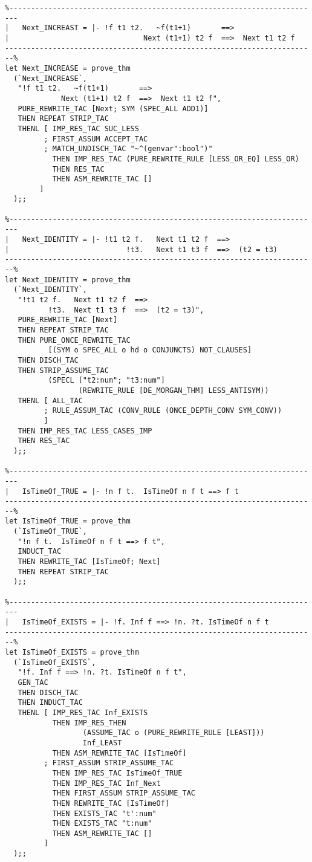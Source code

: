\begin{verbatim}
%------------------------------------------------------------------------
|   Next_INCREAST = |- !f t1 t2.   ~f(t1+1)       ==>
|                               Next (t1+1) t2 f  ==>  Next t1 t2 f
------------------------------------------------------------------------%
let Next_INCREASE = prove_thm
  (`Next_INCREASE`,
   "!f t1 t2.   ~f(t1+1)       ==>
             Next (t1+1) t2 f  ==>  Next t1 t2 f",
   PURE_REWRITE_TAC [Next; SYM (SPEC_ALL ADD1)]
   THEN REPEAT STRIP_TAC
   THENL [ IMP_RES_TAC SUC_LESS
         ; FIRST_ASSUM ACCEPT_TAC
         ; MATCH_UNDISCH_TAC "~^(genvar":bool")"
           THEN IMP_RES_TAC (PURE_REWRITE_RULE [LESS_OR_EQ] LESS_OR)
           THEN RES_TAC
           THEN ASM_REWRITE_TAC []
        ]
  );;

%------------------------------------------------------------------------
|   Next_IDENTITY = |- !t1 t2 f.   Next t1 t2 f  ==>
|                           !t3.   Next t1 t3 f  ==>  (t2 = t3)
------------------------------------------------------------------------%
let Next_IDENTITY = prove_thm
  (`Next_IDENTITY`,
   "!t1 t2 f.   Next t1 t2 f  ==>
          !t3.  Next t1 t3 f  ==>  (t2 = t3)",
   PURE_REWRITE_TAC [Next]
   THEN REPEAT STRIP_TAC
   THEN PURE_ONCE_REWRITE_TAC
          [(SYM o SPEC_ALL o hd o CONJUNCTS) NOT_CLAUSES]
   THEN DISCH_TAC
   THEN STRIP_ASSUME_TAC
          (SPECL ["t2:num"; "t3:num"]
                 (REWRITE_RULE [DE_MORGAN_THM] LESS_ANTISYM))
   THENL [ ALL_TAC
         ; RULE_ASSUM_TAC (CONV_RULE (ONCE_DEPTH_CONV SYM_CONV))
         ]
   THEN IMP_RES_TAC LESS_CASES_IMP
   THEN RES_TAC
  );;

%------------------------------------------------------------------------
|   IsTimeOf_TRUE = |- !n f t.  IsTimeOf n f t ==> f t
------------------------------------------------------------------------%
let IsTimeOf_TRUE = prove_thm
  (`IsTimeOf_TRUE`,
   "!n f t.  IsTimeOf n f t ==> f t",
   INDUCT_TAC
   THEN REWRITE_TAC [IsTimeOf; Next]
   THEN REPEAT STRIP_TAC
  );;

%------------------------------------------------------------------------
|   IsTimeOf_EXISTS = |- !f. Inf f ==> !n. ?t. IsTimeOf n f t
------------------------------------------------------------------------%
let IsTimeOf_EXISTS = prove_thm
  (`IsTimeOf_EXISTS`,
   "!f. Inf f ==> !n. ?t. IsTimeOf n f t",
   GEN_TAC
   THEN DISCH_TAC
   THEN INDUCT_TAC
   THENL [ IMP_RES_TAC Inf_EXISTS
           THEN IMP_RES_THEN
                  (ASSUME_TAC o (PURE_REWRITE_RULE [LEAST]))
                  Inf_LEAST
           THEN ASM_REWRITE_TAC [IsTimeOf]
         ; FIRST_ASSUM STRIP_ASSUME_TAC
           THEN IMP_RES_TAC IsTimeOf_TRUE
           THEN IMP_RES_TAC Inf_Next
           THEN FIRST_ASSUM STRIP_ASSUME_TAC
           THEN REWRITE_TAC [IsTimeOf]
           THEN EXISTS_TAC "t':num"
           THEN EXISTS_TAC "t:num"
           THEN ASM_REWRITE_TAC []
         ]
  );;


\end{verbatim}

